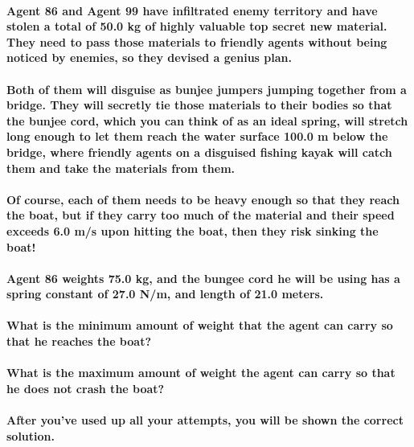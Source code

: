\paragraph{Agent 86 and Agent 99 have inﬁltrated enemy territory and have stolen a total of 50.0 kg of highly valuable top secret new material. They need to pass those materials to friendly agents without being noticed by enemies, so they devised a genius plan.\newline}
\paragraph{Both of them will disguise as bunjee jumpers jumping together from a bridge. They will secretly tie those materials to their bodies so that the bunjee cord, which you can think of as an ideal spring, will stretch long enough to let them reach the water surface 100.0 m below the bridge, where friendly agents on a disguised ﬁshing kayak will catch them and take the materials from them.\newline}
\paragraph{Of course, each of them needs to be heavy enough so that they reach the boat, but if they carry too much of the material and their speed exceeds 6.0 m/s upon hitting the boat, then they risk sinking the boat!\newline}
\paragraph{Agent 86 weights 75.0 kg, and the bungee cord he will be using has a spring constant of 27.0 N/m, and length of 21.0 meters.\newline}
\paragraph{What is the minimum amount of weight that the agent can carry so that he reaches the boat? \newline}
\paragraph{What is the maximum amount of weight the agent can carry so that he does not crash the boat?\newline}
\paragraph{After you’ve used up all your attempts, you will be shown the correct solution. \newline}
